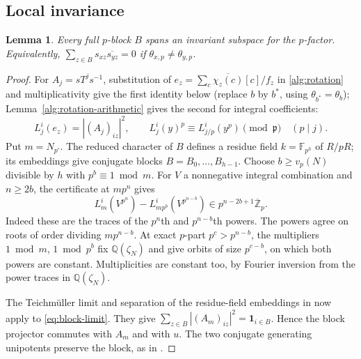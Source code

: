 \documentclass[11pt]{amsart}
\numberwithin{equation}{section}
\newtheorem{lemma}[theorem]{Lemma}
\theoremstyle{definition}
\theoremstyle{plain}
\newcommand{\QQ}{\mathbb Q}
\newcommand{\ZZ}{\mathbb Z}
\begin{document}
\subsection{Local invariance}
\begin{lemma}\label{blk:local}
Every full $p$-block $B$ spans an invariant subspace for the $p$-factor.
Equivalently, $\sum_{z\in B}s_{xz}\overline{s_{yz}}=0$ if
$\theta_{x,p}\ne\theta_{y,p}$.
\end{lemma}
\begin{proof}
For $A_j=sT^js^{-1}$, substitution of
$e_z=\sum_c\overline{\chi_z(c)}[c]/f_z$ in \eqref{alg:rotation} and
multiplicativity give the first identity below (replace $b$ by $b^*$,
using $\theta_{b^*}=\theta_b$); Lemma~\ref{alg:rotation-arithmetic}
gives the second for integral coefficients:
\begin{equation}\label{eq:rotation-entry}
 L_j^i(e_z)=|(A_j)_{iz}|^2,\qquad
 L_j^i(y)^p\equiv L_{j/p}^i(y^p)\pmod{\mathfrak p}\quad(p\mid j).
\end{equation}
Put $m=N_{p'}$. The reduced character of $B$ defines a residue field
$k=\mathbb F_{p^h}$ of $R/pR$; its embeddings give conjugate blocks
$B=B_0,\ldots,B_{h-1}$. Choose $b\ge v_p(N)$ divisible by $h$
with $p^b\equiv1\bmod m$. For $V$ a nonnegative integral combination
and $n\ge2b$, the certificate at $mp^n$ gives
\begin{equation}\label{eq:block-limit}
 L_m^i(V^{p^n})-L_{mp^b}^i(V^{p^{n-b}})
       \in p^{n-2b+1}\overline{\ZZ}_p .
\end{equation}
Indeed these are the traces of the $p^n$th and $p^{n-b}$th powers.
The powers agree on roots of order dividing $mp^{n-b}$. At exact
$p$-part $p^c>p^{n-b}$, the multipliers $1\bmod m$, $1\bmod p^b$
fix $\QQ(\zeta_N)$ and give orbits of size $p^{c-b}$, on which both
powers are constant. Multiplicities are constant too, by Fourier
inversion from the power traces in $\QQ(\zeta_N)$.

The Teichm\"uller limit and separation of the residue-field embeddings in \cite[Theorem~3.2, proof of equation~(3.5)]{BDPcore} now apply to \eqref{eq:block-limit}. They give $\sum_{z\in B}|(A_m)_{iz}|^2=\mathbf1_{i\in B}$. Hence the block projector commutes with $A_m$ and with $u$. The two conjugate generating unipotents preserve the block, as in \cite[Lemma~3.3]{BDPcore}.
\end{proof}
\end{document}
